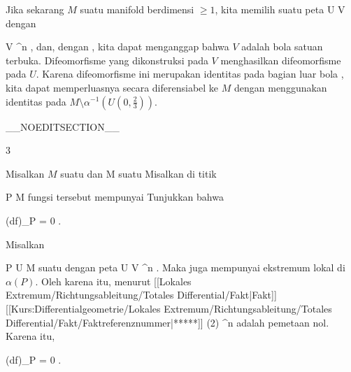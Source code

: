 {Jika sekarang $M$ suatu manifold berdimensi $\geq 1$, kita memilih suatu peta
\maabbdisp {\alpha} { U } {V
} {}
dengan

\mavergleichskette
{\vergleichskette
{ V
}
{ \subseteq }{ \R^n
}
{ }{
}
{ }{
}
{ }{
}
}
{}{}{,}
dan, dengan
 {} {,}
kita dapat menganggap bahwa $V$
 {} {}
adalah bola satuan terbuka. Difeomorfisme yang dikonstruksi pada $V$ menghasilkan difeomorfisme pada $U$. Karena difeomorfisme ini merupakan identitas pada bagian luar bola
 {} {,}
kita dapat memperluasnya secara diferensiabel ke $M$ dengan menggunakan identitas pada $M \setminus \alpha^{-1} \left(  U \left(   0 , { \frac{   2 }{  3 } }   \right)  \right)$.

 }

__NOEDITSECTION__

{3}

{

Misalkan $M$ suatu
dan
 { M } {\R
} {}
suatu
Misalkan di titik

\mavergleichskette
{\vergleichskette
{ P
}
{ \in }{ M
}
{  }{
}
{    }{
}
{   }{
}
}
{}{}{}
fungsi tersebut mempunyai
Tunjukkan bahwa

\mavergleichskettedisp
{\vergleichskette
{ (df)_P
}
{ =} { 0
}
{ } {
}
{ } {
}
{ } {
}
}
{}{}{.}

}
{

Misalkan

\mavergleichskette
{\vergleichskette
{ P
}
{ \in }{ U
}
{ \subseteq }{ M
}
{ }{
}
{ }{
}
}
{}{}{}
suatu
dengan peta
\maabb {\alpha} { U } {V \subseteq \R^n
} {.}
Maka
 juga mempunyai ekstremum lokal di $\alpha(P)$.
Oleh karena itu, menurut
[[Lokales Extremum/Richtungsableitung/Totales Differential/Fakt|Fakt]] [[Kurs:Differentialgeometrie/Lokales Extremum/Richtungsableitung/Totales Differential/Fakt/Faktreferenznummer|*****]] (2)
 {\R^n } {\R
} {}
adalah pemetaan nol. Karena itu,

\mavergleichskette
{\vergleichskette
{ (df)_P
}
{ = }{ 0
}
{ }{
}
{ }{
}
{ }{
}
}
{}{}{.}

 }

